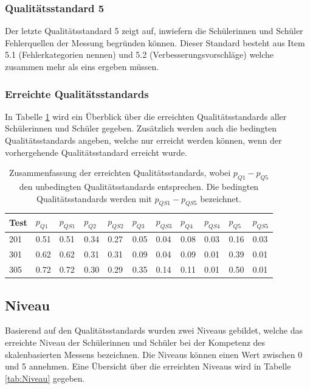 \subsubsection*{Qualitätsstandard 5}
Der letzte Qualitätsstandard 5 zeigt auf, inwiefern die Schülerinnen und Schüler Fehlerquellen der Messung begründen können. Dieser Standard besteht aus Item 5.1 (Fehlerkategorien nennen) und 5.2 (Verbesserungsvorschläge) welche zusammen mehr als eins ergeben müssen.

\subsubsection{Erreichte Qualitätsstandards}

In Tabelle \ref{tab:QS} wird ein Überblick über die erreichten Qualitätsstandards aller Schülerinnen und Schüler gegeben. Zusätzlich werden auch die bedingten Qualitätsstandards angeben, welche nur erreicht werden können, wenn der vorhergehende Qualitätsstandard erreicht wurde.


\begin{table}[!htbp]
  \centering
\begin{tabular}{@{}lllllllllll@{}}
\toprule
 Test & $p_{Q1}$ & $p_{QS1}$ & $p_{Q2}$ & $p_{QS2}$& $p_{Q3}$& $p_{QS3}$& $p_{Q4}$& $p_{QS4}$& $p_{Q5}$& $p_{QS5}$\\ 
\midrule
 201 &   0.51 & 0.51& 0.34 & 0.27 & 0.05 & 0.04 & 0.08 & 0.03 & 0.16 & 0.03 \\ 
 301 &   0.62 & 0.62& 0.31 & 0.31 & 0.09 & 0.04 & 0.09 & 0.01 & 0.39 & 0.01\\ 
 305 &   0.72 & 0.72& 0.30 & 0.29 & 0.35 & 0.14 & 0.11 & 0.01 & 0.50 & 0.01\\ 
\bottomrule
\end{tabular} 
  \caption{Zusammenfassung der erreichten Qualitätsstandards, wobei $p_{Q1} - p_{Q5}$ den unbedingten Qualitätsstandards entsprechen. Die bedingten Qualitätsstandards werden mit $p_{QS1} - p_{QS5}$ bezeichnet.}
  \label{tab:QS}
\end{table}




\subsection{Niveau}

Basierend auf den Qualitätsstandards wurden zwei Niveaus gebildet, welche das erreichte Niveau der Schülerinnen und Schüler bei der Kompetenz des skalenbasierten Messens bezeichnen. Die Niveaus können einen Wert zwischen 0 und 5 annehmen. Eine Übersicht über die erreichten Niveaus wird in Tabelle \ref{tab:Niveau} gegeben.

